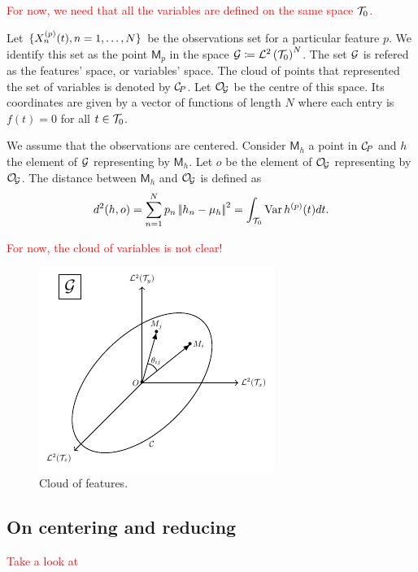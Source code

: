 \textcolor{red}{For now, we need that all the variables are defined on the same space $\mathcal{T}_{0}$.}

Let $\{X_n^{(p)}(t), n = 1, \dots, N\}$ be the observations set for a particular feature $p$. We identify this set as the point $\mathsf{M}_p$ in the space $\mathcal{G} \coloneqq \mathcal{L}^{2}\left(\mathcal{T}_{0}\right)^N$. The set $\mathcal{G}$ is refered as the features' space, or variables' space. The cloud of points that represented the set of variables is denoted by $\mathcal{C}_{\!P}$. Let $\mathcal{O}_{\!\mathcal{G}}$ be the centre of this space. Its coordinates are given by a vector of functions of length $N$ where each entry is $f(t) = 0$ for all $t \in \mathcal{T}_{0}$.

We assume that the observations are centered. Consider $\mathsf{M}_h$ a point in $\mathcal{C}_{\!P}$ and $h$ the element of $\mathcal{G}$ representing by $\mathsf{M}_h$. Let $o$ be the element of $\mathcal{O}_{\!\mathcal{G}}$ representing by $\mathcal{O}_{\!\mathcal{G}}$. The distance between $\mathsf{M}_h$ and $\mathcal{O}_{\!\mathcal{G}}$ is defined as
\begin{equation*}
d^2(h, o) = \sum_{n = 1}^N p_n \left|\!\left|h_n - \mu_h\right|\!\right|^2 = \int_{\mathcal{T}_{0}} \operatorname{Var} h^{(p)}(t)dt.
\end{equation*} 

\textcolor{red}{For now, the cloud of variables is not clear!}

\begin{figure}
    \centering
    \includegraphics[scale=1.2]{figures/cloud_features.pdf}
    \caption{Cloud of features.}
    \label{fig:cloud_features}
\end{figure}

\subsection{On centering and reducing} %
\label{sub:on_centering_and_reducing}

\textcolor{red}{Take a look at \cite{protheroNewPerspectivesCentering2021}}


